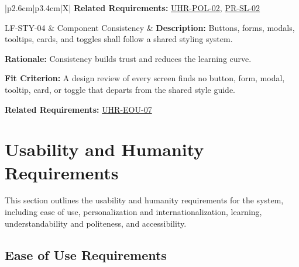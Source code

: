 \documentclass[12pt]{article}
\begin{document}
\begin{xltabular}{\textwidth}{|p{2.6cm}|p{3.4cm}|X|}
\textbf{Related Requirements:} \hyperlink{req:UHR-POL-02}{UHR-POL-02}, \hyperlink{req:PR-SL-02}{PR-SL-02}\\
\hline

LF-STY-04\hypertarget{req:LF-STY-04}{} &
Component Consistency &
\textbf{Description:} Buttons, forms, modals, tooltips, cards, and toggles shall follow a shared styling system.

\textbf{Rationale:} Consistency builds trust and reduces the learning curve.

\textbf{Fit Criterion:} A design review of every screen finds no button, form, modal, tooltip, card, or toggle that departs from the shared style guide.

\textbf{Related Requirements:} \hyperlink{req:UHR-EOU-07}{UHR-EOU-07}\\
\hline

\end{xltabular}

\section{Usability and Humanity Requirements}

This section outlines the usability and humanity requirements for the system, including ease of use, personalization and internationalization, learning, understandability and politeness, and accessibility.

\subsection{Ease of Use Requirements}
\end{document}
